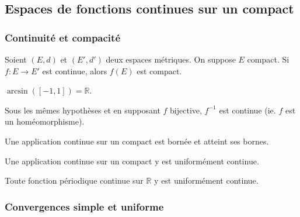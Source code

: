 




	\subsection{Espaces de fonctions continues sur un compact}

	\subsubsection{Continuité et compacité}


	\begin{proposition}
		Soient $(E, d)$ et $(E', d')$ deux espaces métriques. On suppose $E$ compact. Si $f : E \rightarrow E'$ est continue, alors $f(E)$ est compact.
	\end{proposition}

	\begin{cexample}
		$\arcsin([-1, 1]) = \mathbb{R}$.
	\end{cexample}

	\begin{proposition}
		Sous les mêmes hypothèses et en supposant $f$ bijective, $f^{-1}$ est continue (ie. $f$ est un homéomorphisme).
	\end{proposition}

	\begin{theorem}
		Une application continue sur un compact est bornée et atteint ses bornes.
	\end{theorem}

	\begin{theorem}[Heine]
		Une application continue sur un compact y est uniformément continue.
	\end{theorem}

	\begin{corollary}
		Toute fonction périodique continue sur $\mathbb{R}$ y est uniformément continue.
	\end{corollary}

	\subsubsection{Convergences simple et uniforme}


